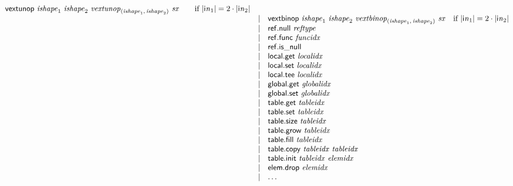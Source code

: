 $$\begin{array}{@{}lrrl@{}l@{}}
\mathsf{vextunop}~{\mathit{ishape}}_{{1}}~{\mathit{ishape}}_{{2}}~{{\mathit{vextunop}}}_{({\mathit{ishape}}_{{1}},\, {\mathit{ishape}}_{{2}})}~{\mathit{sx}} &\quad
  \mbox{if}~{|{{\mathsf{i}}{{\mathit{n}}}}_{{1}}|} = 2 \cdot {|{{\mathsf{i}}{{\mathit{n}}}}_{{2}}|} \\ &&|&
\mathsf{vextbinop}~{\mathit{ishape}}_{{1}}~{\mathit{ishape}}_{{2}}~{{\mathit{vextbinop}}}_{({\mathit{ishape}}_{{1}},\, {\mathit{ishape}}_{{2}})}~{\mathit{sx}} &\quad
  \mbox{if}~{|{{\mathsf{i}}{{\mathit{n}}}}_{{1}}|} = 2 \cdot {|{{\mathsf{i}}{{\mathit{n}}}}_{{2}}|} \\ &&|&
\mathsf{ref.null}~{\mathit{reftype}} \\ &&|&
\mathsf{ref.func}~{\mathit{funcidx}} \\ &&|&
\mathsf{ref.is\_null} \\ &&|&
\mathsf{local.get}~{\mathit{localidx}} \\ &&|&
\mathsf{local.set}~{\mathit{localidx}} \\ &&|&
\mathsf{local.tee}~{\mathit{localidx}} \\ &&|&
\mathsf{global.get}~{\mathit{globalidx}} \\ &&|&
\mathsf{global.set}~{\mathit{globalidx}} \\ &&|&
\mathsf{table.get}~{\mathit{tableidx}} \\ &&|&
\mathsf{table.set}~{\mathit{tableidx}} \\ &&|&
\mathsf{table.size}~{\mathit{tableidx}} \\ &&|&
\mathsf{table.grow}~{\mathit{tableidx}} \\ &&|&
\mathsf{table.fill}~{\mathit{tableidx}} \\ &&|&
\mathsf{table.copy}~{\mathit{tableidx}}~{\mathit{tableidx}} \\ &&|&
\mathsf{table.init}~{\mathit{tableidx}}~{\mathit{elemidx}} \\ &&|&
\mathsf{elem.drop}~{\mathit{elemidx}} \\ &&|&
\dots \\
\end{array}
$$

\vspace{1ex}

